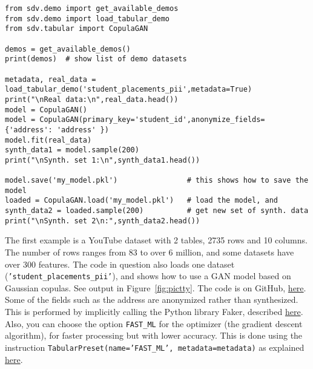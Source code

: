 \documentclass[oneside,10pt]{book}
\begin{document}
\begin{lstlisting}
from sdv.demo import get_available_demos
from sdv.demo import load_tabular_demo
from sdv.tabular import CopulaGAN

demos = get_available_demos()
print(demos)  # show list of demo datasets

metadata, real_data = load_tabular_demo('student_placements_pii',metadata=True)
print("\nReal data:\n",real_data.head())
model = CopulaGAN()
model = CopulaGAN(primary_key='student_id',anonymize_fields={'address': 'address' })
model.fit(real_data)
synth_data1 = model.sample(200)
print("\nSynth. set 1:\n",synth_data1.head())

model.save('my_model.pkl')                # this shows how to save the model
loaded = CopulaGAN.load('my_model.pkl')   # load the model, and 
synth_data2 = loaded.sample(200)          # get new set of synth. data
print("\nSynth. set 2\n:",synth_data2.head())
\end{lstlisting}\vspace{1ex}

The first example is a YouTube dataset with 2 tables, 2735 rows and 10 columns. The number of rows ranges from 83 to over 6 million, and some datasets have over 300 features. The code in question also loads one dataset (\texttt{'student\_placements\_pii'}), and shows how to use a GAN model based on \textcolor{index}{Gaussian copulas}. See output in Figure~\ref{fig:pictty}. The code is on GitHub, \href{https://github.com/VincentGranville/Main/blob/main/GAN_copula_SDV.py}{here}. Some of the fields such as the address are anonymized rather than synthesized. This is performed by
 implicitly calling the Python library Faker, described \href{https://pypi.org/project/Faker/}{here}. 
Also, you can choose the option \texttt{FAST\_ML} for the optimizer (the gradient descent algorithm), for faster processing but with lower
 accuracy. This is done using the instruction 
\texttt{TabularPreset(name='FAST\_ML', metadata=metadata)} as explained \href{https://medium.com/@davide.gazze/sdv-generate-synthetic-data-using-gan-and-python-4c26a1e4b3c2}{here}. 
\end{document}
